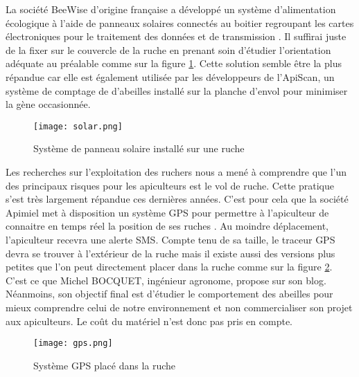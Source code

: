 La société BeeWise d'origine française a développé un système d'alimentation écologique à l'aide de panneaux solaires connectés au  boitier regroupant les cartes électroniques pour le traitement des données et de transmission \cite{BeeWise}. Il suffirai juste de la fixer sur le couvercle de la ruche en prenant soin d'étudier l'orientation adéquate au préalable comme sur la figure \ref{fig:solar}. Cette solution semble être la plus répandue car elle est également utilisée par les développeurs de l'ApiScan, un système de comptage de d'abeilles installé sur la planche d'envol pour minimiser la gène occasionnée.    

\begin{figure}[h]
\centering\texttt{[image: solar.png]}
\caption{\label{fig:solar} Système de panneau solaire installé sur une ruche}
\end{figure} 

Les recherches sur l'exploitation des ruchers nous a mené à comprendre que l'un des principaux risques pour les apiculteurs est le vol de ruche. Cette pratique s'est très largement répandue ces dernières années. C'est pour cela que la société Apimiel met à disposition un système GPS pour permettre à l'apiculteur de connaitre en temps réel la position de ses ruches \cite{Apimiel}. Au moindre déplacement, l'apiculteur recevra une alerte SMS. Compte tenu de sa taille, le traceur GPS devra se trouver à l'extérieur de la ruche mais il existe aussi des versions plus petites que l'on peut directement placer dans la ruche comme sur la figure \ref{fig:gps}. C'est ce que Michel BOCQUET, ingénieur agronome, propose sur son blog. Néanmoins, son objectif final est d'étudier le comportement des abeilles pour mieux comprendre celui de notre environnement et non commercialiser son projet aux apiculteurs. Le coût du matériel n'est donc pas pris en compte. 

\begin{figure}[h]
\centering\texttt{[image: gps.png]}
\caption{\label{fig:gps} Système GPS placé dans la ruche}
\end{figure} 
     

   